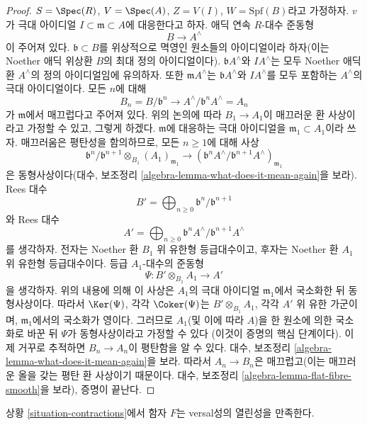 \begin{proof}
\medskip\noindent
$S = \Spec(R)$, $V = \Spec(A)$, $Z = V(I)$,
$W = \text{Spf}(B)$라고 가정하자.
$v$가 극대 아이디얼 $I \subset \mathfrak m \subset A$에 대응한다고 하자.
애딕 연속 $R$-대수 준동형
$$
B \longrightarrow A^\wedge
$$
이 주어져 있다. $\mathfrak b \subset B$를 위상적으로 멱영인
원소들의 아이디얼이라 하자(이는 Noether 애딕 위상환 $B$의
최대 정의 아이디얼이다). $\mathfrak b A^\wedge$와 $IA^\wedge$는
모두 Noether 애딕 환 $A^\wedge$의 정의 아이디얼임에 유의하자.
또한 $\mathfrak m A^\wedge$는 $\mathfrak b A^\wedge$와
$IA^\wedge$를 모두 포함하는 $A^\wedge$의 극대 아이디얼이다.
모든 $n$에 대해
$$
B_n = B/\mathfrak b^n \to A^\wedge/\mathfrak b^n A^\wedge = A_n
$$
가 $\mathfrak m$에서 매끄럽다고 주어져 있다. 위의 논의에 따라
$B_1 \to A_1$이 매끄러운 환 사상이라고 가정할 수 있고, 그렇게 하겠다.
$\mathfrak m$에 대응하는 극대 아이디얼을
$\mathfrak m_1 \subset A_1$이라 쓰자.
매끄러움은 평탄성을 함의하므로, 모든 $n \geq 1$에 대해 사상
$$
\mathfrak b^n/\mathfrak b^{n + 1} \otimes_{B_1} (A_1)_{\mathfrak m_1}
\longrightarrow
\left(\mathfrak b^nA^\wedge/\mathfrak b^{n + 1}A^\wedge\right)_{\mathfrak m_1}
$$
은 동형사상이다(대수, 보조정리
\ref{algebra-lemma-what-does-it-mean-again}을 보라).
Rees 대수
$$
B' = \bigoplus\nolimits_{n \geq 0} \mathfrak b^n/\mathfrak b^{n + 1}
$$
와 Rees 대수
$$
A' = \bigoplus\nolimits_{n \geq 0}
\mathfrak b^nA^\wedge/\mathfrak b^{n + 1}A^\wedge
$$
를 생각하자. 전자는 Noether 환 $B_1$ 위 유한형 등급대수이고,
후자는 Noether 환 $A_1$ 위 유한형 등급대수이다.
등급 $A_1$-대수의 준동형
$$
\Psi : B' \otimes_{B_1} A_1 \longrightarrow A'
$$
을 생각하자. 위의 내용에 의해 이 사상은 $A_1$의 극대 아이디얼
$\mathfrak m_1$에서 국소화한 뒤 동형사상이다.
따라서 $\Ker(\Psi)$, 각각 $\Coker(\Psi)$는
$B' \otimes_{B_1} A_1$, 각각 $A'$ 위 유한 가군이며,
$\mathfrak m_1$에서의 국소화가 영이다. 그러므로 $A_1$(및 이에 따라 $A$)을
한 원소에 의한 국소화로 바꾼 뒤 $\Psi$가 동형사상이라고 가정할 수 있다
(이것이 증명의 핵심 단계이다). 이제 거꾸로 추적하면
$B_n \to A_n$이 평탄함을 알 수 있다. 대수, 보조정리
\ref{algebra-lemma-what-does-it-mean-again}을 보라.
따라서 $A_n \to B_n$은 매끄럽고(이는 매끄러운 올을 갖는 평탄 환 사상이기
때문이다. 대수, 보조정리 \ref{algebra-lemma-flat-fibre-smooth}을 보라),
증명이 끝난다.
\end{proof}

\begin{lemma}
\label{lemma-openness-versality}
상황 \ref{situation-contractions}에서 함자 $F$는
versal성의 열린성을 만족한다.
\end{lemma}


